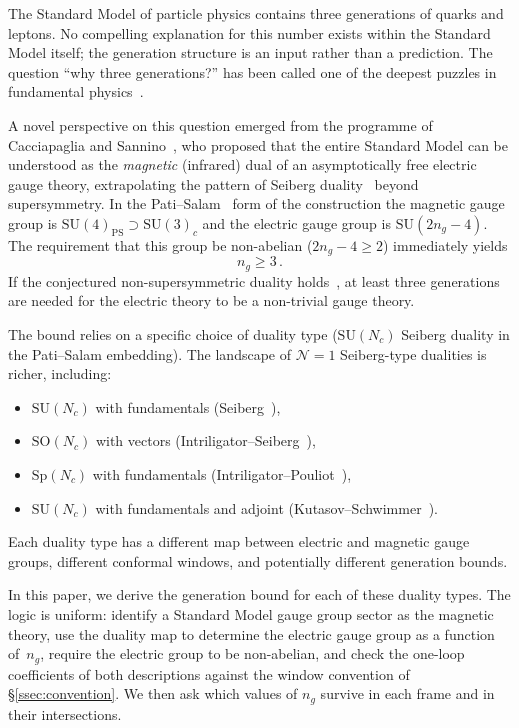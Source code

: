 \documentclass[11pt,a4paper]{article}
\theoremstyle{plain}
\theoremstyle{definition}
\theoremstyle{remark}
\newcommand{\Nc}{N_{\!c}}
\newcommand{\ngen}{n_g}
\newcommand{\SU}[1]{\mathrm{SU}(#1)}
\newcommand{\SO}[1]{\mathrm{SO}(#1)}
\newcommand{\Sp}[1]{\mathrm{Sp}(#1)}
\begin{document}
The Standard Model of particle physics contains three generations of
quarks and leptons.  No compelling explanation for this number exists
within the Standard Model itself; the generation structure is an input
rather than a prediction.  The question ``why three generations?'' has
been called one of the deepest puzzles in fundamental
physics~\cite{Frampton1992}.

A novel perspective on this question emerged from the programme of
Cacciapaglia and Sannino~\cite{CacciapagliaSannino2024,Sannino2011},
who proposed that the entire Standard Model can be understood as the
\emph{magnetic} (infrared) dual of an asymptotically free electric gauge
theory, extrapolating the pattern of Seiberg
duality~\cite{Seiberg1995} beyond supersymmetry.  In the
Pati--Salam~\cite{PS1974} form of the construction the magnetic gauge
group is $\SU{4}_{\mathrm{PS}} \supset \SU{3}_c$ and the electric gauge
group is $\SU{2\ngen - 4}$.  The requirement that this group be
non-abelian ($2\ngen - 4 \geq 2$) immediately yields
\begin{equation}\label{eq:CS-bound}
  \ngen \geq 3\,.
\end{equation}
If the conjectured non-supersymmetric duality
holds~\cite{AMPS2011,Sannino2011}, at least three generations are needed
for the electric theory to be a non-trivial gauge theory.

The bound relies on a specific choice of duality type ($\SU{\Nc}$
Seiberg duality in the Pati--Salam embedding).  The landscape of
$\mathcal{N}=1$ Seiberg-type dualities is richer, including:
\begin{itemize}
  \item $\SU{\Nc}$ with fundamentals (Seiberg~\cite{Seiberg1995}),
  \item $\SO{\Nc}$ with vectors
    (Intriligator--Seiberg~\cite{IS9506101}),
  \item $\Sp{\Nc}$ with fundamentals
    (Intriligator--Pouliot~\cite{IP9505006}),
  \item $\SU{\Nc}$ with fundamentals and adjoint
    (Kutasov--Schwimmer~\cite{KS9505004}).
\end{itemize}
Each duality type has a different map between electric and magnetic gauge
groups, different conformal windows, and potentially different generation
bounds.

In this paper, we derive the generation bound for each of these duality
types.  The logic is uniform: identify a Standard Model gauge group
sector as the magnetic theory, use the duality map to determine the
electric gauge group as a function of~$\ngen$, require the electric group
to be non-abelian, and check the one-loop coefficients of both
descriptions against the window convention of \S\ref{ssec:convention}.
We then ask which values of $\ngen$ survive in each frame and in their
intersections.
\end{document}
